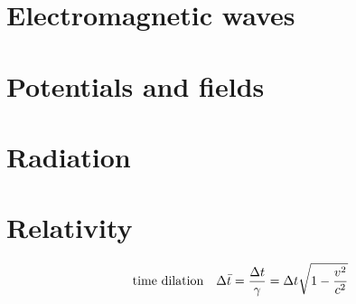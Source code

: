 \documentclass[12pt]{article}
\begin{document}
\section{Electromagnetic waves}

\section{Potentials and fields}

\section{Radiation}

\section{Relativity}
\[\qq{time dilation} \Delta{\bar{t}}=\frac{\Delta{t}}{\gamma}=\Delta{t}\sqrt{1-\frac{v^2}{c^2}}\]
\end{document}
